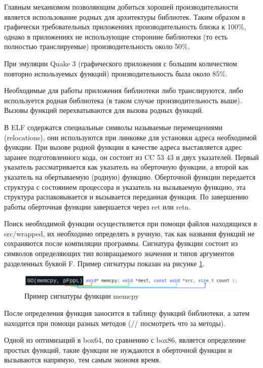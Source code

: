 Главным механизмом позволяющим добиться хорошей производительности является использование родных для архитектуры библиотек. Таким образом в графически требовательных приложениях производительность близка к 100\%, однако в приложениях не использующие сторонние библиотеки (то есть полностью транслируемые) производительность около 50\%.

При эмуляции Quake 3 (графического приложения с большим количеством повторно используемых функций) производительность была около 85\%.

Необходимые для работы приложения библиотеки либо транслируются, либо используется родная библиотека (в таком случае производительность выше). Вызовы функций перехватываются для вызова родных функций. 

В ELF содержатся специальные символы называемые перемещениями (relocations), они используются при линковке для установки адреса необходимой функции. При вызове родной функции в качестве адреса выставляется адрес заранее подготовленного кода, он состоит из CC 53 43 и двух указателей. Первый указатель рассматривается как указатель на оберточную функции, а второй как указатель на обертываемую (родную) функцию. Оберточной функции передается структура с состоянием процессора и указатель на вызываемую функцию, эта структура распаковывается и вызывается переданная функция. По завершению работы оберточная функции завершается через ret или retn.

Поиск необходимой функции осуществляется при помощи файлов находящихся в src/wrapped, их необходимо определять в ручную, так как названия функций не сохраняются после компиляции программы. Сигнатура функции состоит из символов определяющих тип возвращаемого значения и типов аргументов разделенных буквой F. Пример сигнатуры показан на рисунке \ref{fig:box64sig}.

\begin{figure}[hbtp]
	\centering
	\includegraphics[width=\textwidth]{img/box64_sig.png}
	\caption{Пример сигнатуры функции memcpy}
	\label{fig:box64sig}
\end{figure}

После определения функция заносится в таблицу функций библиотеки, а затем находится при помощи разных методов (// посмотреть что за методы).

Одной из оптимизаций в box64, по сравнению с box86, является определение простых функций, такие функции не нуждаются в оберточной функции и вызываются напрямую, тем самым экономя время.

